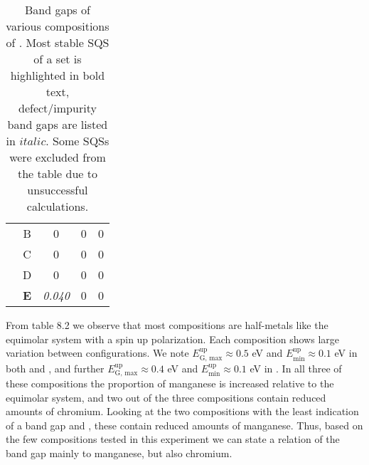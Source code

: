 \begin{table}[H]
\begin{tabular}{@{}ccccc@{}}
\multicolumn{1}{c|}{}                                       & B          & 0                                                                           & 0                                                                           & 0                                                                                 \\
\multicolumn{1}{c|}{}                                       & C          & 0                                                                           & 0                                                                           & 0                                                                                 \\
\multicolumn{1}{c|}{}                                       & D          & 0                                                                           & 0                                                                           & 0                                                                                 \\
\multicolumn{1}{c|}{}                                       & \textbf{E} & \textit{0.040}                                                               & 0                                                                           & 0                                                                                 \\ \bottomrule 
\end{tabular}
\caption{Band gaps of various compositions of . Most stable SQS of a set is highlighted in bold text, defect/impurity band gaps are listed in $italic$. Some SQSs were excluded from the table due to unsuccessful calculations.}
\end{table}

From table 8.2 we observe that most compositions are half-metals like the equimolar system with a spin up polarization. Each composition shows large variation between configurations. We note $E_\text{G, max} ^\text{up} \approx 0.5$ eV and $E_\text{min} ^\text{up} \approx 0.1$ eV in both  and , and further $E_\text{G, max} ^\text{up} \approx 0.4$ eV and $E_\text{min} ^\text{up} \approx 0.1$ eV in . In all three of these compositions the proportion of manganese is increased relative to the equimolar system, and two out of the three compositions contain reduced amounts of chromium. Looking at the two compositions with the least indication of a band gap  and , these contain reduced amounts of manganese. Thus, based on the few compositions tested in this experiment we can state a relation of the band gap mainly to manganese, but also chromium.     

